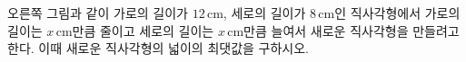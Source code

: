 \noindent\begin{minipage}[t]{0.58\linewidth}\vspace{0pt}\raggedright 오른쪽 그림과 같이 가로의 길이가 $12\,\mathrm{cm}$, 세로의 길이가 $8\,\mathrm{cm}$인 직사각형에서 가로의 길이는 $x\,\mathrm{cm}$만큼 줄이고 세로의 길이는 $x\,\mathrm{cm}$만큼 늘여서 새로운 직사각형을 만들려고 한다. 이때 새로운 직사각형의 넓이의 최댓값을 구하시오. \end{minipage}\hfill\begin{minipage}[t]{0.4\linewidth}\vspace{0pt}\centering \resizebox{\ifdim\width>\linewidth\linewidth\else\width\fi}{!}{}\end{minipage}\par
